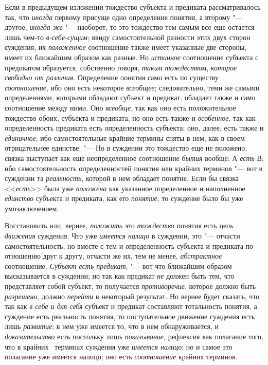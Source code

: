 {Если в предыдущем изложении тождество субъекта и предиката
рассматривалось так, что {\em иногда}
первому присуще одно определение понятия, а второму
"--- другое, {\em иногда же}
"--- наоборот, то это тождество тем самым все еще остается лишь
чем-то {\em в-себе-сущим};
ввиду самостоятельной разности этих двух сторон суждения, их
{\em положенное}
соотношение также имеет указанные две стороны, имеет их
ближайшим образом как разные. Но
{\em истинное}
соотношение субъекта с предикатом образуется, собственно
говоря, {\em таким тождеством},
{\em которое свободно от различия}.
Определение понятия само есть по существу
{\em соотношение}, ибо
оно есть некоторое {\em всеобщее};
следовательно, теми же самыми определениями, которыми
обладают субъект и предикат, обладает также и само соотношение между ними.
Оно {\em всеобще}, так
как оно есть положительное тождество обоих, субъекта и предиката; но оно
есть также и
{\em особенное},
так как определенность предиката есть определенность
субъекта; оно, далее, есть также и
{\em единичное}, ибо
самостоятельные крайние термины сняты в нем, как в своем отрицательнее
единстве. "--- Но в суждении это тождество еще не положено;
связка выступает как еще неопределенное соотношение
{\em бытия} вообще: А
{\em есть} В; ибо
самостоятельность определенностей понятия или крайних терминов
"--- вот в суждении та
{\em реальность}, которой
в нем обладает понятие. Если бы связка
<<{\em есть}>> была уже
{\em положена} как
указанное определенное и наполненное
{\em единство} субъекта и
предиката, как его {\em понятие},
то суждение было бы уже умозаключением.

Восстановить или, вернее,
{\em положить} это
{\em тождество} понятия
есть цель {\em движения}
суждения. Что уже
{\em имеется налицо }в
суждении, это "--- отчасти самостоятельность, но вместе с тем и
определенность субъекта и предиката по отношению друг к другу, отчасти же
их, тем не менее, {\em абстрактное}
соотношение. {\em Субъект
есть предикат}, "--- вот что ближайшим образом высказывается в
суждении; но так как предикат {\em не}
должен быть тем, что представляет собой субъект, то
получается {\em противоречие},
которое должно быть
{\em разрешено}, должно
{\em перейти} в некоторый
результат. Но вернее будет сказать, что так как
{\em в себе и для себя}
субъект и предикат составляют тотальность понятия, а суждение
есть реальность понятия, то поступательное движение суждения есть лишь
{\em развитие}; в нем уже
имеется то, что в нем обнаруживается, и
{\em доказательство} есть
постольку лишь {\em показывание},
рефлексия как полагание того, что в крайних
\ терминах суждения уже
{\em имеется налицо}; но
и самое это полагание уже имеется налицо; оно есть
{\em соотношение} крайних
терминов.

}
